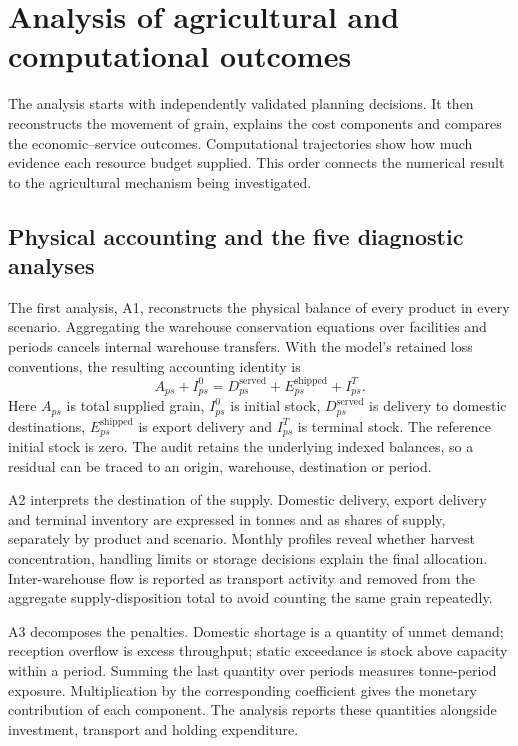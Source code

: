\documentclass[11pt,a4paper]{article}
\begin{document}
\section{Analysis of agricultural and computational outcomes}
\label{sec:analysis}

The analysis starts with independently validated planning decisions. It then reconstructs the movement of grain, explains the cost components and compares the economic--service outcomes. Computational trajectories show how much evidence each resource budget supplied. This order connects the numerical result to the agricultural mechanism being investigated.

\subsection{Physical accounting and the five diagnostic analyses}

The first analysis, A1, reconstructs the physical balance of every product in every scenario. Aggregating the warehouse conservation equations over facilities and periods cancels internal warehouse transfers. With the model's retained loss conventions, the resulting accounting identity is
\begin{equation}
 A_{ps}+I^{0}_{ps}=D^{\mathrm{served}}_{ps}
       +E^{\mathrm{shipped}}_{ps}+I^{T}_{ps}.
 \label{eq:aggregatebalance}
\end{equation}
Here $A_{ps}$ is total supplied grain, $I^{0}_{ps}$ is initial stock, $D^{\mathrm{served}}_{ps}$ is delivery to domestic destinations, $E^{\mathrm{shipped}}_{ps}$ is export delivery and $I^{T}_{ps}$ is terminal stock. The reference initial stock is zero. The audit retains the underlying indexed balances, so a residual can be traced to an origin, warehouse, destination or period.

A2 interprets the destination of the supply. Domestic delivery, export delivery and terminal inventory are expressed in tonnes and as shares of supply, separately by product and scenario. Monthly profiles reveal whether harvest concentration, handling limits or storage decisions explain the final allocation. Inter-warehouse flow is reported as transport activity and removed from the aggregate supply-disposition total to avoid counting the same grain repeatedly.

A3 decomposes the penalties. Domestic shortage is a quantity of unmet demand; reception overflow is excess throughput; static exceedance is stock above capacity within a period. Summing the last quantity over periods measures tonne-period exposure. Multiplication by the corresponding coefficient gives the monetary contribution of each component. The analysis reports these quantities alongside investment, transport and holding expenditure.
\end{document}
